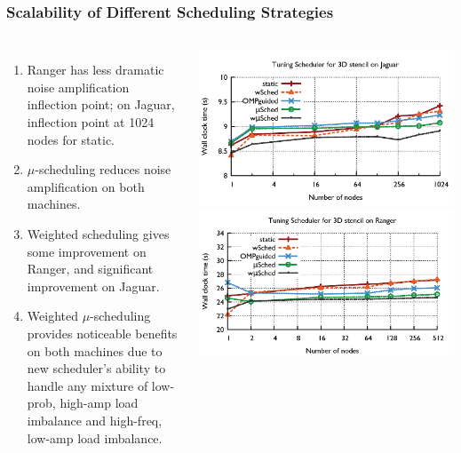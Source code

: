 \begin{frame}
\frametitle{Scalability of Different Scheduling Strategies} 

\begin{columns} 
\begin{enumerate} 
\item \tiny Ranger has less dramatic noise amplification inflection
  point; on Jaguar, inflection point at 1024 nodes for static. 
\item \tiny $\mu$-scheduling reduces noise amplification on both machines.
\item \tiny Weighted scheduling gives some improvement on Ranger, and 
significant improvement on Jaguar. 
\item \tiny Weighted $\mu$-scheduling provides noticeable benefits on
  both machines due to new scheduler's ability to handle any mixture
  of low-prob, high-amp load imbalance and high-freq, low-amp load
  imbalance. 
\end{enumerate} 
\includegraphics[width=\textwidth]{images/schedulerTuningJaguar}   
\includegraphics[width=\textwidth]{images/schedulerTuningRanger} 
\end{columns}   
\end{frame} 



